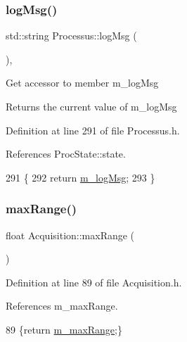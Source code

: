 \subsubsection{\texorpdfstring{log\+Msg()}{logMsg()}}
{\footnotesize\ttfamily std\+::string Processus\+::log\+Msg (\begin{DoxyParamCaption}{ }\end{DoxyParamCaption})\hspace{0.3cm}{\ttfamily [inline]}, {\ttfamily [inherited]}}

Get accessor to member m\+\_\+log\+Msg \begin{DoxyReturn}{Returns}
the current value of m\+\_\+log\+Msg 
\end{DoxyReturn}


Definition at line 291 of file Processus.\+h.



References Proc\+State\+::state.


\begin{DoxyCode}
291                       \{
292     \textcolor{keywordflow}{return} \hyperlink{classProcessus_a3bc0140a3a69a83951ab7f9986bd2c84}{m\_logMsg};
293   \}
\end{DoxyCode}
\mbox{\label{classAcquisition_a386f3ebc6b1d4956aa7e40b314ddb4eb}} 
\subsubsection{\texorpdfstring{max\+Range()}{maxRange()}\hspace{0.1cm}{\footnotesize\ttfamily [1/2]}}
{\footnotesize\ttfamily float Acquisition\+::max\+Range (\begin{DoxyParamCaption}{ }\end{DoxyParamCaption})\hspace{0.3cm}{\ttfamily [inline]}}



Definition at line 89 of file Acquisition.\+h.



References m\+\_\+max\+Range.


\begin{DoxyCode}
89 \{\textcolor{keywordflow}{return} \hyperlink{classAcquisition_a45478629e9db582470b4b158edb46616}{m\_maxRange};\}
\end{DoxyCode}
\mbox{\label{classAcquisition_a386f3ebc6b1d4956aa7e40b314ddb4eb}} 
